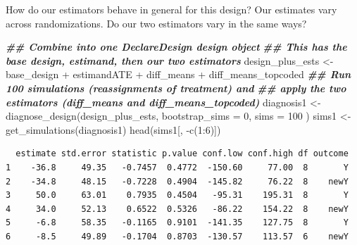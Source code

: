 \documentclass[
  ignorenonframetext,
]{beamer}
\newenvironment{Shaded}{\begin{snugshade}}{\end{snugshade}}
\newcommand{\AttributeTok}[1]{\textcolor[rgb]{0.77,0.63,0.00}{#1}}
\newcommand{\DecValTok}[1]{\textcolor[rgb]{0.00,0.00,0.81}{#1}}
\newcommand{\DocumentationTok}[1]{\textcolor[rgb]{0.56,0.35,0.01}{\textbf{\textit{#1}}}}
\newcommand{\FunctionTok}[1]{\textcolor[rgb]{0.00,0.00,0.00}{#1}}
\newcommand{\NormalTok}[1]{#1}
\newcommand{\OtherTok}[1]{\textcolor[rgb]{0.56,0.35,0.01}{#1}}
\newcommand{\SpecialCharTok}[1]{\textcolor[rgb]{0.00,0.00,0.00}{#1}}
\begin{document}
\begin{frame}[fragile]{How do our estimators behave in general for this
design?}
\protect\hypertarget{how-do-our-estimators-behave-in-general-for-this-design}{}
Our estimates vary across randomizations. Do our two estimators vary in
the same ways?

\scriptsize

\begin{Shaded}
\begin{Highlighting}[]
\DocumentationTok{\#\# Combine into one DeclareDesign design object}
\DocumentationTok{\#\# This has the base design, estimand, then our two estimators}
\NormalTok{design\_plus\_ests }\OtherTok{\textless{}{-}}\NormalTok{ base\_design }\SpecialCharTok{+}\NormalTok{ estimandATE }\SpecialCharTok{+}\NormalTok{ diff\_means }\SpecialCharTok{+}
\NormalTok{  diff\_means\_topcoded}
\DocumentationTok{\#\# Run 100 simulations (reassignments of treatment) and}
\DocumentationTok{\#\# apply the two estimators (diff\_means and diff\_means\_topcoded)}
\NormalTok{diagnosis1 }\OtherTok{\textless{}{-}} \FunctionTok{diagnose\_design}\NormalTok{(design\_plus\_ests,}
  \AttributeTok{bootstrap\_sims =} \DecValTok{0}\NormalTok{, }\AttributeTok{sims =} \DecValTok{100}
\NormalTok{)}
\NormalTok{sims1 }\OtherTok{\textless{}{-}} \FunctionTok{get\_simulations}\NormalTok{(diagnosis1)}
\FunctionTok{head}\NormalTok{(sims1[, }\SpecialCharTok{{-}}\FunctionTok{c}\NormalTok{(}\DecValTok{1}\SpecialCharTok{:}\DecValTok{6}\NormalTok{)])}
\end{Highlighting}
\end{Shaded}

\begin{verbatim}
  estimate std.error statistic p.value conf.low conf.high df outcome
1    -36.8     49.35   -0.7457  0.4772  -150.60     77.00  8       Y
2    -34.8     48.15   -0.7228  0.4904  -145.82     76.22  8    newY
3     50.0     63.01    0.7935  0.4504   -95.31    195.31  8       Y
4     34.0     52.13    0.6522  0.5326   -86.22    154.22  8    newY
5     -6.8     58.35   -0.1165  0.9101  -141.35    127.75  8       Y
6     -8.5     49.89   -0.1704  0.8703  -130.57    113.57  6    newY
\end{verbatim}

\normalsize
\end{frame}
\end{document}
